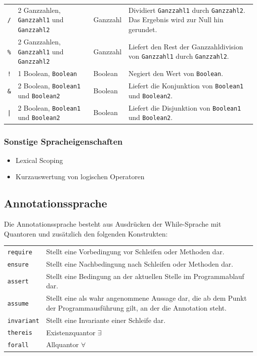 \documentclass[a4paper,10pt]{article}
\begin{document}
\begin{tabularx}{\textwidth}{| l | X | l | X |}
\texttt{/} & 2 Ganzzahlen, \texttt{Ganzzahl1} und \texttt{Ganzzahl2} & Ganzzahl & Dividiert \texttt{Ganzzahl1} durch \texttt{Ganzzahl2}. Das Ergebnis wird zur Null hin gerundet.\\
\texttt{\%} & 2 Ganzzahlen, \texttt{Ganzzahl1} und \texttt{Ganzzahl2} & Ganzzahl & Liefert den Rest der Ganzzahldivision von \texttt{Ganzzahl1} durch \texttt{Ganzzahl2}.\\
\hline
\texttt{!} & 1 Boolean, \texttt{Boolean} & Boolean & Negiert den Wert von \texttt{Boolean}.\\
\texttt{\&} & 2 Boolean, \texttt{Boolean1} und \texttt{Boolean2} & Boolean & Liefert die Konjunktion von \texttt{Boolean1} und \texttt{Boolean2}.\\
\texttt{|} & 2 Boolean, \texttt{Boolean1} und \texttt{Boolean2} & Boolean & Liefert die Disjunktion von \texttt{Boolean1} und \texttt{Boolean2}.\\
\hline
\end{tabularx}
\subsubsection{Sonstige Spracheigenschaften}
\begin{itemize}
  \item Lexical Scoping
  \item Kurzauswertung von logischen Operatoren
\end{itemize}

\subsection{Annotationssprache}
Die Annotationssprache besteht aus Ausdr\"{u}cken der While-Sprache mit Quantoren und zus\"{a}tzlich den folgenden Konstrukten:\\
\begin{tabularx}{\textwidth}{| l | X |}
\hline
\texttt{require} & Stellt eine Vorbedingung vor Schleifen oder Methoden dar.\\
\texttt{ensure} & Stellt eine Nachbedingung nach Schleifen oder Methoden dar.\\
\texttt{assert} & Stellt eine Bedingung an der aktuellen Stelle im Programmablauf dar.\\
\texttt{assume} & Stellt eine als wahr angenommene Aussage dar, die ab dem Punkt der Programmausf\"{u}hrung gilt, an der die Annotation steht.\\
\texttt{invariant} & Stellt eine Invariante einer Schleife dar.\\
\hline
\texttt{thereis} & Existenzquantor $\exists$\\
\texttt{forall} & Allquantor $\forall$\\
\hline
\end{tabularx}
\end{document}
